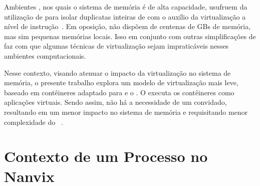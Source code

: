 Ambientes \cloud, nos quais o sistema de memória é de alta capacidade, usufruem da utilização de \vms para isolar duplicatas inteiras de \oss com o auxílio da virtualização a nível de instrução~\cite{sharma2016containers}. Em oposição, \lws não dispõem de centenas de GBs de memória, mas sim pequenas memórias locais. Isso em conjunto com outras simplificações de \hardware faz com que algumas técnicas de virtualização sejam impraticáveis nesses ambientes computacionais.

Nesse contexto, visando atenuar o impacto da virtualização no sistema de memória, o presente trabalho explora um modelo de virtualização mais leve, baseado em contêineres adaptado para \lws e o \nanvix. O \so executa os contêineres como aplicações virtuais. Sendo assim, não há a necessidade de um \os convidado, resultando em um menor impacto no sistema de memória e requisitando menor complexidade do \hardware~\cite{thalheim2018cntr, sharma2016containers,zhang2018comparative}.




\section{Contexto de um Processo no Nanvix}


